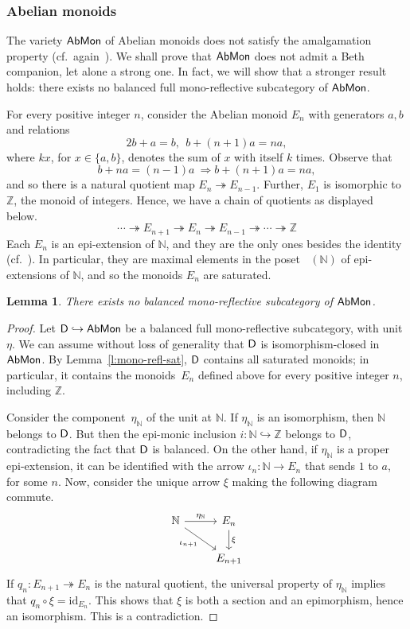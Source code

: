 \documentclass[a4paper,10pt,reqno]{amsart}
\newtheorem{lemma}[theorem]{Lemma}
\theoremstyle{definition}
\theoremstyle{remark}
\newcommand{\N}{\mathbb{N}}				%
\newcommand{\Z}{\mathbb{Z}}				%
\newcommand{\catt}{{\sf D}}								%
\newcommand{\AMon}{{\sf AbMon}}							%
\newcommand{\id}{\mathrm{id}}								%
\newcommand{\into}{\hookrightarrow}						%
\DeclareMathOperator{\EExt}{Ext_{p}}					%
\begin{document}
\subsubsection*{Abelian monoids} 
The variety $\AMon$ of Abelian monoids does not satisfy the amalgamation property (cf.\ again~\cite{Metcalfe2026}). We shall prove that $\AMon$ does not admit a Beth companion, let alone a strong one. In fact, we will show that a stronger result holds: there exists no balanced full mono-reflective subcategory of $\AMon$.

For every positive integer $n$, consider the Abelian monoid $E_{n}$ with generators $a,b$ and relations
\[
2b + a = b, \ \ b + (n+1) a = n a,
\]
where $kx$, for $x\in \{a,b\}$, denotes the sum of $x$ with itself $k$ times. Observe that
\[
b + n a = (n-1) a \ \Longrightarrow b + (n+1) a = n a,
\]
and so there is a natural quotient map $E_{n}\twoheadrightarrow E_{n-1}$. Further, $E_{1}$ is isomorphic to~$\Z$, the monoid of integers. Hence, we have a chain of quotients as displayed below.
\[
\cdots \twoheadrightarrow E_{n+1} \twoheadrightarrow E_{n}\twoheadrightarrow E_{n-1} \twoheadrightarrow \cdots \twoheadrightarrow \Z
\]
Each $E_{n}$ is an epi-extension of $\N$, and they are the only ones besides the identity (cf.\ \cite[p.~241]{Isbell1966}). In particular, they are maximal elements in the poset $\EExt(\N)$ of epi-extensions of $\N$, and so the monoids $E_{n}$ are saturated.

\begin{lemma}\label{l:AMon-no-Beth-completion}
There exists no balanced mono-reflective subcategory of $\AMon$.
\end{lemma}
%
\begin{proof}
Let $\catt\into \AMon$ be a balanced full mono-reflective subcategory, with unit $\eta$. We can assume without loss of generality that $\catt$ is isomorphism-closed in $\AMon$. By Lemma~\ref{l:mono-refl-sat}, $\catt$ contains all saturated monoids; in particular, it contains the monoids~$E_{n}$ defined above for every positive integer $n$, including $\Z$. 

Consider the component~$\eta_{\N}$ of the unit at $\N$. If $\eta_{\N}$ is an isomorphism, then $\N$ belongs to $\catt$. But then the epi-monic inclusion $i\colon \N\into \Z$ belongs to $\catt$, contradicting the fact that $\catt$ is balanced.
%
On the other hand, if $\eta_{\N}$ is a proper epi-extension, it can be identified with the arrow ${\iota_{n}\colon \N\to E_{n}}$ that sends $1$ to $a$, for some $n$. Now, consider the unique arrow $\xi$ making the following diagram commute.
\[\begin{tikzcd}
\N \arrow{r}{\eta_{\N}} \arrow{dr}[swap]{\iota_{n+1}} & E_{n} \arrow{d}{\xi} \\
{} & E_{n+1}
\end{tikzcd}\]
If $q_{n}\colon E_{n+1}\twoheadrightarrow E_{n}$ is the natural quotient, the universal property of $\eta_{\N}$ implies that $q_{n}\circ \xi =\id_{E_{n}}$. This shows that $\xi$ is both a section and an epimorphism, hence an isomorphism. This is a contradiction.
\end{proof}
\end{document}
